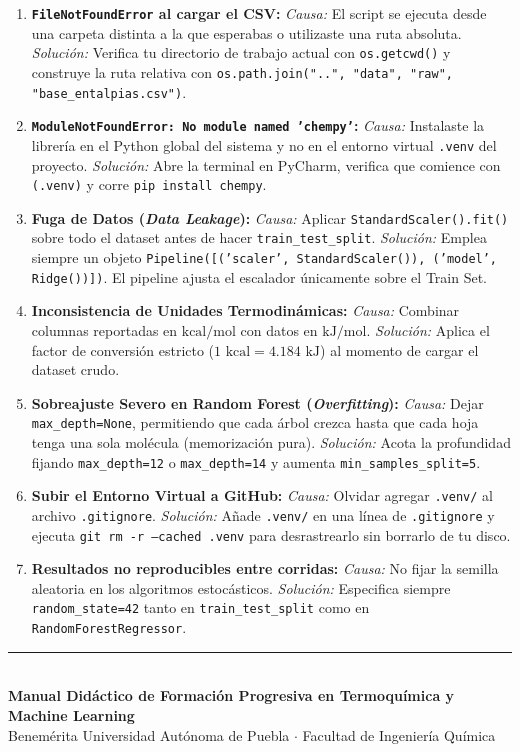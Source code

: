 \documentclass[11pt,letterpaper]{report}
\begin{document}
\begin{enumerate}[leftmargin=*]
    \item \textbf{\texttt{FileNotFoundError} al cargar el CSV:}  
    \textit{Causa:} El script se ejecuta desde una carpeta distinta a la que esperabas o utilizaste una ruta absoluta.  
    \textit{Solución:} Verifica tu directorio de trabajo actual con \texttt{os.getcwd()} y construye la ruta relativa con \texttt{os.path.join("..", "data", "raw", "base\_entalpias.csv")}.
    
    \item \textbf{\texttt{ModuleNotFoundError: No module named 'chempy'}:}  
    \textit{Causa:} Instalaste la librería en el Python global del sistema y no en el entorno virtual \texttt{.venv} del proyecto.  
    \textit{Solución:} Abre la terminal en PyCharm, verifica que comience con \texttt{(.venv)} y corre \texttt{pip install chempy}.
    
    \item \textbf{Fuga de Datos (\textit{Data Leakage}):}  
    \textit{Causa:} Aplicar \texttt{StandardScaler().fit()} sobre todo el dataset antes de hacer \texttt{train\_test\_split}.  
    \textit{Solución:} Emplea siempre un objeto \texttt{Pipeline([('scaler', StandardScaler()), ('model', Ridge())])}. El pipeline ajusta el escalador únicamente sobre el Train Set.
    
    \item \textbf{Inconsistencia de Unidades Termodinámicas:}  
    \textit{Causa:} Combinar columnas reportadas en $\text{kcal/mol}$ con datos en $\text{kJ/mol}$.  
    \textit{Solución:} Aplica el factor de conversión estricto ($1\text{ kcal} = 4.184\text{ kJ}$) al momento de cargar el dataset crudo.
    
    \item \textbf{Sobreajuste Severo en Random Forest (\textit{Overfitting}):}  
    \textit{Causa:} Dejar \texttt{max\_depth=None}, permitiendo que cada árbol crezca hasta que cada hoja tenga una sola molécula (memorización pura).  
    \textit{Solución:} Acota la profundidad fijando \texttt{max\_depth=12} o \texttt{max\_depth=14} y aumenta \texttt{min\_samples\_split=5}.
    
    \item \textbf{Subir el Entorno Virtual a GitHub:}  
    \textit{Causa:} Olvidar agregar \texttt{.venv/} al archivo \texttt{.gitignore}.  
    \textit{Solución:} Añade \texttt{.venv/} en una línea de \texttt{.gitignore} y ejecuta \texttt{git rm -r --cached .venv} para desrastrearlo sin borrarlo de tu disco.
    
    \item \textbf{Resultados no reproducibles entre corridas:}  
    \textit{Causa:} No fijar la semilla aleatoria en los algoritmos estocásticos.  
    \textit{Solución:} Especifica siempre \texttt{random\_state=42} tanto en \texttt{train\_test\_split} como en \texttt{RandomForestRegressor}.
\end{enumerate}

\vfill
\begin{center}
    \rule{0.6\textwidth}{0.6pt}\\[0.2cm]
    {\small \textbf{Manual Didáctico de Formación Progresiva en Termoquímica y Machine Learning}}\\[0.1cm]
    {\footnotesize Benemérita Universidad Autónoma de Puebla $\cdot$ Facultad de Ingeniería Química}
\end{center}
\end{document}
